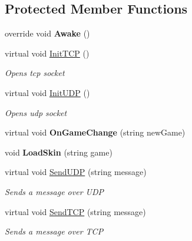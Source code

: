 \subsection*{Protected Member Functions}
\begin{DoxyCompactItemize}
\item 
\mbox{\label{class_enhanced_dodo_server_1_1_client_a0844a331dd248a28fcf9d9713a9e4a18}} 
override void {\bfseries Awake} ()
\item 
virtual void \mbox{\hyperlink{class_enhanced_dodo_server_1_1_client_a47f19f54ab101e4d411f79930478d38b}{Init\+T\+CP}} ()
\begin{DoxyCompactList}\small\item\em Opens tcp socket \end{DoxyCompactList}\item 
virtual void \mbox{\hyperlink{class_enhanced_dodo_server_1_1_client_a37607b608dcd44136f90327643350fbc}{Init\+U\+DP}} ()
\begin{DoxyCompactList}\small\item\em Opens udp socket \end{DoxyCompactList}\item 
\mbox{\label{class_enhanced_dodo_server_1_1_client_aab24c74f72f421ccf9a2f3b4bbe36e22}} 
virtual void {\bfseries On\+Game\+Change} (string new\+Game)
\item 
\mbox{\label{class_enhanced_dodo_server_1_1_client_a97284e4c0a62786427485785f4e23def}} 
void {\bfseries Load\+Skin} (string game)
\item 
virtual void \mbox{\hyperlink{class_enhanced_dodo_server_1_1_client_a04448d0ac12be1706d4f5e3d2888c3be}{Send\+U\+DP}} (string message)
\begin{DoxyCompactList}\small\item\em Sends a message over U\+DP \end{DoxyCompactList}\item 
virtual void \mbox{\hyperlink{class_enhanced_dodo_server_1_1_client_a544f2325afe25591a1db8bee3902ed98}{Send\+T\+CP}} (string message)
\begin{DoxyCompactList}\small\item\em Sends a message over T\+CP \end{DoxyCompactList}\end{DoxyCompactItemize}
